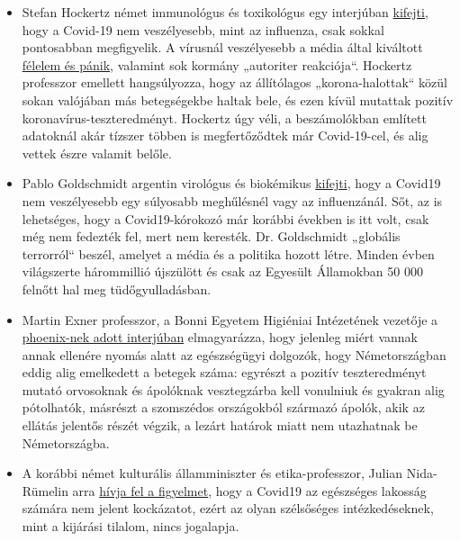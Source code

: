 \begin{itemize}
\tightlist
\item
  Stefan Hockertz német immunológus és toxikológus egy interjúban
  \href{https://www.youtube.com/watch?v=7wfb-B0BWmo}{kifejti}, hogy a
  Covid-19 nem veszélyesebb, mint az influenza, csak sokkal pontosabban
  megfigyelik. A vírusnál veszélyesebb a média által kiváltott
  \href{https://corona.rs2.de/blog/interview/das-virus-macht-uns-nicht-krank/}{félelem
  és pánik}, valamint sok kormány „autoriter reakciója``. Hockertz
  professzor emellett hangsúlyozza, hogy az állítólagos
  „korona-halottak`` közül sokan valójában más betegségekbe haltak bele,
  és ezen kívül mutattak pozitív koronavírus-teszteredményt. Hockertz
  úgy véli, a beszámolókban említett adatoknál akár tízszer többen is
  megfertőződtek már Covid-19-cel, és alig vettek észre valamit belőle.
\item
  Pablo Goldschmidt argentin virológus és biokémikus
  \href{https://www.clarin.com/buena-vida/coronavirus-panico-injustificado-dice-virologo-argentino-francia_0_yVcmJ4RM.html}{kifejti},
  hogy a Covid19 nem veszélyesebb egy súlyosabb meghűlésnél vagy az
  influenzánál. Sőt, az is lehetséges, hogy a Covid19-kórokozó már
  korábbi években is itt volt, csak még nem fedezték fel, mert nem
  keresték. Dr. Goldschmidt „globális terrorról`` beszél, amelyet a
  média és a politika hozott létre. Minden évben világszerte hárommillió
  újszülött és csak az Egyesült Államokban 50 000 felnőtt hal meg
  tüdőgyulladásban.
\item
  Martin Exner professzor, a Bonni Egyetem Higiéniai Intézetének
  vezetője a
  \href{https://www.youtube.com/watch?v=9mI9trSm3PY}{phoenix-nek adott
  interjúban} elmagyarázza, hogy jelenleg miért vannak annak ellenére
  nyomás alatt az egészségügyi dolgozók, hogy Németországban eddig alig
  emelkedett a betegek száma: egyrészt a pozitív teszteredményt mutató
  orvosoknak és ápolóknak vesztegzárba kell vonulniuk és gyakran alig
  pótolhatók, másrészt a szomszédos országokból származó ápolók, akik az
  ellátás jelentős részét végzik, a lezárt határok miatt nem utazhatnak
  be Németországba.
\item
  A korábbi német kulturális államminiszter és etika-professzor, Julian
  Nida-Rümelin arra
  \href{https://www.zdf.de/nachrichten/zdf-morgenmagazin/julian-nida-ruemelin-zur-corona-krise-100.html}{hívja
  fel a figyelmet}, hogy a Covid19 az egészséges lakosság számára nem
  jelent kockázatot, ezért az olyan szélsőséges intézkedéseknek, mint a
  kijárási tilalom, nincs jogalapja.

\end{itemize}
